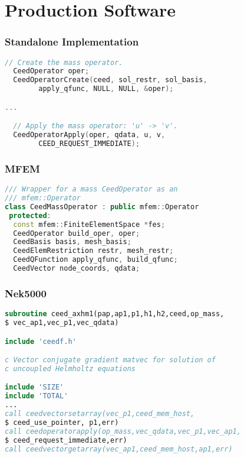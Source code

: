 \documentclass{beamer}
\begin{document}
\section{Production Software}

\begin{frame}[fragile]
\begin{center}
\frametitle{Standalone Implementation}

\begin{lstlisting}[language=C]
  // Create the mass operator.
  CeedOperator oper;
  CeedOperatorCreate(ceed, sol_restr, sol_basis,
		apply_qfunc, NULL, NULL, &oper);

...

  // Apply the mass operator: 'u' -> 'v'.
  CeedOperatorApply(oper, qdata, u, v, 
		CEED_REQUEST_IMMEDIATE);
\end{lstlisting}

\end{center}
\end{frame}


\begin{frame}[fragile]
\begin{center}
\frametitle{MFEM}

{\small
\begin{lstlisting}[language=c++]
/// Wrapper for a mass CeedOperator as an
/// mfem::Operator
class CeedMassOperator : public mfem::Operator
 protected:
  const mfem::FiniteElementSpace *fes;
  CeedOperator build_oper, oper;
  CeedBasis basis, mesh_basis;
  CeedElemRestriction restr, mesh_restr;
  CeedQFunction apply_qfunc, build_qfunc;
  CeedVector node_coords, qdata;

\end{lstlisting}
}

\end{center}
\end{frame}


\begin{frame}[fragile]
\begin{center}
\frametitle{Nek5000}

{\small
\begin{lstlisting}[language=Fortran]
subroutine ceed_axhm1(pap,ap1,p1,h1,h2,ceed,op_mass,
$ vec_ap1,vec_p1,vec_qdata)

include 'ceedf.h'

c Vector conjugate gradient matvec for solution of 
c uncoupled Helmholtz equations

include 'SIZE'
include 'TOTAL'
...
call ceedvectorsetarray(vec_p1,ceed_mem_host,
$ ceed_use_pointer, p1,err)
call ceedoperatorapply(op_mass,vec_qdata,vec_p1,vec_ap1,
$ ceed_request_immediate,err)
call ceedvectorgetarray(vec_ap1,ceed_mem_host,ap1,err)
\end{lstlisting}
}

\end{center}
\end{frame}
\end{document}
